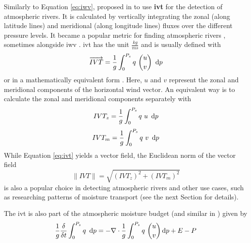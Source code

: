 Similarly to Equation \ref{eq:iwv},  \citeauthor{zhu_proposed_1998} proposed in \cite{zhu_proposed_1998} to use \textbf{\ac{ivt}} for the detection of atmospheric rivers. 
It is calculated by vertically integrating the zonal (along latitude lines) and meridional (along longitude lines) fluxes over the different pressure levels.
It became a popular metric for finding atmospheric rivers \cite{gimeno_atmospheric_2014}, sometimes alongside \ac{iwv} \cite{eiras-barca_seasonal_2016}.
\ac{ivt} has the unit $\frac{kg}{ms}$ and is usually defined with
\begin{equation}
\label{eq:ivt}  
\overrightarrow{IVT} = \frac{1}{g} \int^{P_s}_0 q ~\binom{u}{v} ~ \operatorname{d}\!{p}
\end{equation}
or in a mathematically equivalent form \cite{fernandez_analysis_2003}.
Here, $u$ and $v$ represent the zonal and meridional components of the horizontal wind vector. 
An equivalent way is to calculate the zonal and meridional components separately with 
\begin{equation}
\label{eq:zonal_ivt}
IVT_z = \frac{1}{g} \int^{P_s}_0 q ~u ~ \operatorname{d}\!{p}
\end{equation}
\begin{equation}
\label{eq:meridional_ivt}
IVT_m = \frac{1}{g} \int^{P_s}_0 q ~v ~ \operatorname{d}\!{p}
\end{equation}
While Equation \ref{eq:ivt} yields a vector field, the Euclidean norm of the vector field 
\begin{equation}
\label{eq:ivtnorm}
\lVert IVT \rVert = \sqrt{(IVT_z)^2 + (IVT_m)^2}  
\end{equation}
is also a popular choice in detecting atmospheric rivers \cite{sousa_north_2020, ramos_atmospheric_2016, lan_topological_2024} and other use cases, such as researching patterns of moisture transport \cite{ayantobo_integrated_2022, kim_ensos_2015, zhou_atmospheric_2005, zou_investigating_2020} (see the next Section for details).



The \ac{ivt} is also part of the atmospheric moisture budget \cite{yang_moisture_2022} (and similar in \cite{seager_mechanisms_2020}) given by 
\begin{equation}
\label{eq:moisture_budget}
\frac{1}{g} \frac{\delta}{\delta t} \int^{P_s}_0 q ~ \operatorname{d}\!{p} = - \nabla \cdot \frac{1}{g} \int^{P_s}_0 q ~\binom{u}{v} \operatorname{d}\!{p} + E - P
\end{equation}


